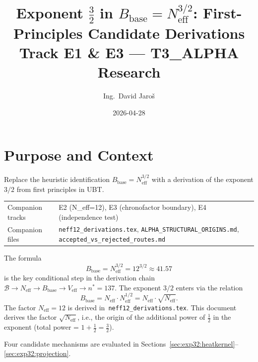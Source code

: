 \documentclass[12pt,a4paper]{article}
\title{\textbf{Exponent $\tfrac{3}{2}$ in $B_{\mathrm{base}} = N_{\mathrm{eff}}^{3/2}$:
         First-Principles Candidate Derivations}\\[6pt]
         \large Track E1 \& E3 — T3\_ALPHA Research}
\author{Ing.\ David Jaro\v{s}}
\date{2026-04-28}
\theoremstyle{definition}
\theoremstyle{remark}
\begin{document}
  \maketitle
  \tableofcontents
  \bigskip
\fi

\section{Purpose and Context}
\label{sec:exp32:purpose}

\begin{tcolorbox}[colback=blue!4!white,colframe=blue!50!black,title=Track E1 Objective]
Replace the heuristic identification $B_{\mathrm{base}} = N_{\mathrm{eff}}^{3/2}$
with a derivation of the exponent $3/2$ from first principles in UBT.

\medskip
\begin{tabular}{ll}
Companion tracks & E2 (N\_eff=12), E3 (chronofactor boundary), E4 (independence test) \\
Companion files  & \texttt{neff12\_derivations.tex}, \texttt{ALPHA\_STRUCTURAL\_ORIGINS.md},
                   \texttt{accepted\_vs\_rejected\_routes.md} \\
\end{tabular}
\end{tcolorbox}

The formula
\begin{equation}
  B_{\mathrm{base}} = N_{\mathrm{eff}}^{3/2} = 12^{3/2} \approx 41.57
  \label{eq:exp32:Bbase}
\end{equation}
is the key conditional step in the derivation chain
$\mathcal{B} \to N_{\mathrm{eff}} \to B_{\mathrm{base}} \to V_{\mathrm{eff}} \to n^* = 137$.
The exponent $3/2$ enters via the relation
\begin{equation}
  B_{\mathrm{base}} = N_{\mathrm{eff}} \cdot N_{\mathrm{eff}}^{1/2}
  = N_{\mathrm{eff}} \cdot \sqrt{N_{\mathrm{eff}}}.
  \label{eq:exp32:split}
\end{equation}
The factor $N_{\mathrm{eff}} = 12$ is derived in~\texttt{neff12\_derivations.tex}.
This document derives the factor $\sqrt{N_{\mathrm{eff}}}$, i.e., the origin of
the additional power of $\tfrac{1}{2}$ in the exponent (total power = $1 + \tfrac{1}{2} = \tfrac{3}{2}$).

Four candidate mechanisms are evaluated in Sections~\ref{sec:exp32:heatkernel}--\ref{sec:exp32:projection}.
\end{document}
